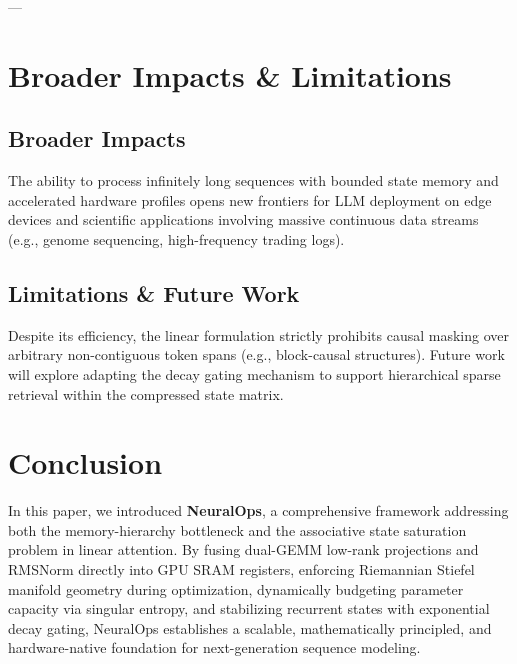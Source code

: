 \documentclass[10pt,twocolumn,letterpaper]{article}
\begin{document}
---


\section{Broader Impacts \& Limitations}
\label{sec:impacts}

\subsection{Broader Impacts}
The ability to process infinitely long sequences with bounded state memory and accelerated hardware profiles opens new frontiers for LLM deployment on edge devices and scientific applications involving massive continuous data streams (e.g., genome sequencing, high-frequency trading logs).

\subsection{Limitations \& Future Work}
Despite its efficiency, the linear formulation strictly prohibits causal masking over arbitrary non-contiguous token spans (e.g., block-causal structures). Future work will explore adapting the decay gating mechanism to support hierarchical sparse retrieval within the compressed state matrix.

\section{Conclusion}
\label{sec:conclusion}

In this paper, we introduced \textbf{NeuralOps}, a comprehensive framework addressing both the memory-hierarchy bottleneck and the associative state saturation problem in linear attention. By fusing dual-GEMM low-rank projections and RMSNorm directly into GPU SRAM registers, enforcing Riemannian Stiefel manifold geometry during optimization, dynamically budgeting parameter capacity via singular entropy, and stabilizing recurrent states with exponential decay gating, NeuralOps establishes a scalable, mathematically principled, and hardware-native foundation for next-generation sequence modeling.
\end{document}
